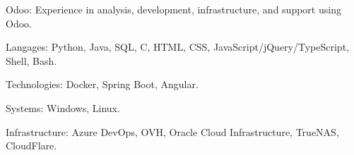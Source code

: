 \begin{indentsection}{\parindent}
  \begin{description*}
    \item[Odoo:] Experience in analysis, development, infrastructure, and support using Odoo.
    \item[Langages:] Python, Java, SQL, C, HTML, CSS, JavaScript/jQuery/TypeScript, Shell, Bash.
    \item[Technologies:] Docker, Spring Boot, Angular.
    \item[Systems:] Windows, Linux.
    \item[Infrastructure:] Azure DevOps, OVH, Oracle Cloud Infrastructure, TrueNAS, CloudFlare.

  \end{description*}
\end{indentsection}
